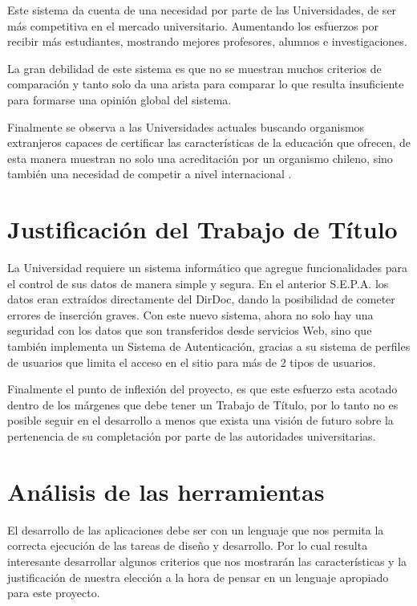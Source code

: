 \documentclass[a4paper,12pt,openany,oneside]{book}
\begin{document}
Este sistema da cuenta de una necesidad por parte de las Universidades, de ser más competitiva en el mercado universitario. Aumentando los esfuerzos por recibir más estudiantes, mostrando mejores profesores, alumnos e investigaciones.

La gran debilidad de este sistema es que no se muestran muchos criterios de comparación y tanto solo da una arista para comparar lo que resulta insuficiente para formarse una opinión global del sistema.

Finalmente se observa a las Universidades actuales buscando organismos extranjeros capaces de certificar las características de la educación que ofrecen, de esta manera muestran no solo una acreditación por un organismo chileno, sino también una necesidad de competir a nivel internacional \cite{data3}.

\section{Justificación del Trabajo de Título}
La Universidad requiere un sistema informático que agregue funcionalidades para el control de sus datos de manera simple y segura. En el anterior S.E.P.A. los datos eran extraídos directamente del DirDoc, dando la posibilidad de cometer errores de inserción graves. Con este nuevo sistema, ahora no solo hay una seguridad con los datos que son transferidos desde servicios Web, sino que también implementa un Sistema de Autenticación, gracias a su sistema de perfiles de usuarios que limita el acceso en el sitio para más de 2 tipos de usuarios.

Finalmente el punto de inflexión del proyecto, es que este esfuerzo esta acotado dentro de los márgenes que debe tener un Trabajo de Título, por lo tanto no es posible seguir en el desarrollo a menos que exista una visión de futuro sobre la pertenencia de su completación por parte de las autoridades universitarias.
\section{Análisis de las herramientas}
El desarrollo de las aplicaciones debe ser con un lenguaje que nos permita la correcta ejecución de las tareas de diseño y desarrollo. Por lo cual resulta interesante desarrollar algunos criterios que nos mostrarán las características y la justificación de nuestra elección a la hora de pensar en un lenguaje apropiado para este proyecto.
\end{document}
